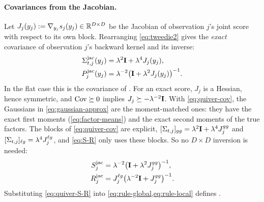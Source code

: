 \paragraph{Covariances from the Jacobian.}
Let $J_j(y_j):=\nabla_{y_j}s_j(y_j)\in\mathbb{R}^{D\times D}$ be the Jacobian of observation $j$'s joint score with respect to its own block.
Rearranging \cref{eq:tweedie2} gives the \emph{exact} covariance of observation $j$'s backward kernel and its inverse:
\begin{equation}\label{eq:quiver-cov}
\begin{aligned}
  \Sigma_{t,j}^{\mathrm{jac}}(y_j)&=\lambda^2\mathbf{I}+\lambda^4J_j(y_j),\\
  P_j^{\mathrm{jac}}(y_j)&=\lambda^{-2}\big(\mathbf{I}+\lambda^2J_j(y_j)\big)^{-1}.
\end{aligned}
\end{equation}
In the flat case this is the covariance of \jac.
For an exact score, $J_j$ is a Hessian, hence symmetric, and $\operatorname{Cov}\succeq0$ implies $J_j\succeq-\lambda^{-2}\mathbf{I}$.
With \cref{eq:quiver-cov}, the Gaussians in \cref{eq:gaussian-approx} are the moment-matched ones: they have the exact first moments (\cref{eq:factor-means}) and the exact second moments of the true factors.
The blocks of \cref{eq:quiver-cov} are explicit, $[\Sigma_{t,j}]_{gg}=\lambda^2\mathbf{I}+\lambda^4J_j^{gg}$ and $[\Sigma_{t,j}]_{\ell g}=\lambda^4J_j^{\ell g}$, and \cref{eq:S-R} only uses these blocks.
So no $D\times D$ inversion is needed:
\begin{equation}\label{eq:quiver-S-R}
\begin{aligned}
  S_j^{\mathrm{jac}}&=\lambda^{-2}\big(\mathbf{I}+\lambda^2J_j^{gg}\big)^{-1},\\
  R_j^{\mathrm{jac}}&=J_j^{\ell g}\big(\lambda^{-2}\mathbf{I}+J_j^{gg}\big)^{-1}.
\end{aligned}
\end{equation}
Substituting \cref{eq:quiver-S-R} into \cref{eq:rule-global,eq:rule-local} defines \quiver.

